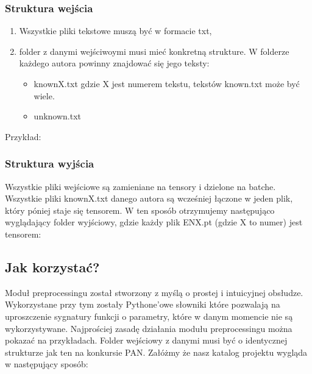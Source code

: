 \subsubsection{Struktura wejścia}

\begin{enumerate}
	\item Wszystkie pliki tekstowe muszą być w formacie txt,
	\item folder z danymi wejściwoymi musi mieć konkretną strukture. W folderze każdego autora
		  powinny znajdować się jego teksty: 
			\begin{itemize}
				\item knownX.txt gdzie X jest numerem tekstu, tekstów known.txt może być wiele.
				\item unknown.txt
			\end{itemize}
\end{enumerate}

Przykład: 

\myspace
{}
\myspace

\newpage
\subsubsection{Struktura wyjścia}

Wszystkie pliki wejściowe są zamieniane na tensory i dzielone na batche. Wszystkie pliki knownX.txt 
danego autora są wcześniej łączone w jeden plik, który póniej staje się tensorem. W ten sposób 
otrzymujemy następująco wyglądający folder wyjściowy, gdzie każdy plik ENX.pt (gdzie X to numer)
 jest tensorem:

\myspace
{}
\myspace


\newpage
\subsection{Jak korzystać?}
Moduł preprocessingu został stworzony z myślą o prostej i intuicyjnej obsłudze. Wykorzystane przy
tym zostały Pythone'owe słowniki które pozwalają na uproszczenie sygnatury funkcji o parametry, które
w danym momencie nie są wykorzystywane. Najprościej zasadę działania modułu preprocessingu można 
pokazać na przykładach. Folder wejściowy z danymi musi być o identycznej strukturze jak ten na 
konkursie PAN.
Załóżmy że nasz katalog projektu wygląda w następujący sposób:




